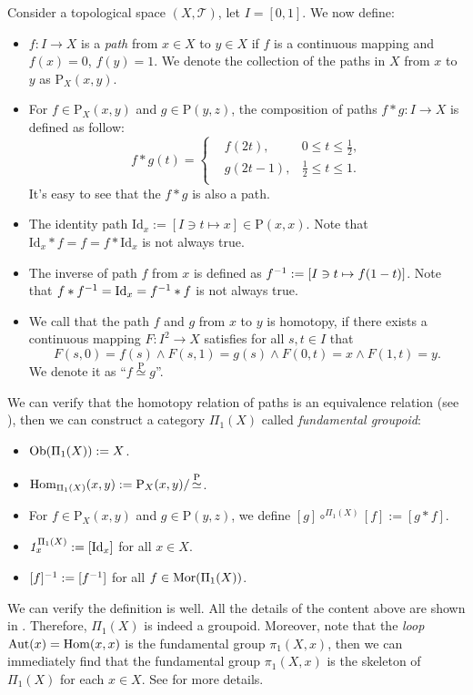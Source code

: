 \documentclass{article}
\begin{document}
\begin{exm}
	Consider a topological space $(X,\mathcal{T})$, let $I=[0,1]$. We now define: 
	\begin{itemize}
		\item $f:I\to X$ is a \emph{path} from $x\in X$ to $y\in X$ if $f$ is a continuous mapping and $f(x)=0$, $f(y)=1$. We denote the collection of the paths in $X$ from $x$ to $y$ as $\mathrm{P}_X(x,y)$.
		\item For $f\in\mathrm{P}_X(x,y)$ and $g\in\mathrm{P}(y,z)$, the composition of paths $f*g:I\to X$ is defined as follow:
			$$f*g(t)=\left\{\begin{aligned}
				& f(2t),   & 0\leq t\leq\frac{1}{2},\\
				& g(2t-1), & \frac{1}{2}\leq t\leq1.\\
			\end{aligned}\right.$$
			It's easy to see that the $f*g$ is also a path.
		\item The identity path $\mathrm{Id}_x:=[I\ni t\mapsto x]\in\mathrm{P}(x,x)$. Note that $\mathrm{Id}_x*f=f=f*\mathrm{Id}_x$ is not always true.
		\item The inverse of path $f$ from $x$ is defined as $f^{-1}:=[I\ni t\mapsto f(1-t)]$. Note that $f*f^{-1}=\mathrm{Id}_x=f^{-1}*f$ is not always true.
		\item We call that the path $f$ and $g$ from $x$ to $y$ is homotopy, if there exists a continuous mapping $F:I^2\to X$ satisfies for all $s,t\in I$ that
			$$F(s,0)=f(s)\wedge F(s,1)=g(s)\wedge F(0,t)=x\wedge F(1,t)=y.$$
		We denote it as ``$f\mathop{\simeq}\limits^\mathrm{P}g$''.
	\end{itemize}
	
	We can verify that the homotopy relation of paths is an equivalence relation (see \cite[定理 10.1.1]{top-1}), then we can construct a category $\Pi_1(X)$ called \emph{fundamental groupoid}:
	\begin{itemize}
		\item $\mathrm{Ob}(\Pi_1(X)):=X$.
		\item $\mathrm{Hom}_{\Pi_1(X)}(x,y):=\mathrm{P}_X(x,y)/\mathop{\simeq}\limits^\mathrm{P}$.
		\item For $f\in\mathrm{P}_X(x,y)$ and $g\in\mathrm{P}(y,z)$, we define $[g]\circ^{\Pi_1(X)}[f]:=[g*f]$.
		\item $\mathit{1}^{\Pi_1(X)}_x:=[\mathrm{Id}_x]$ for all $x\in X$.
		\item $[f]^{-1}:=[f^{-1}]$ for all $f\in\mathrm{Mor}(\Pi_1(X))$.
	\end{itemize}
	We can verify the definition is well. All the details of the content above are shown in \cite[\S10.1]{top-1}. Therefore, $\Pi_1(X)$ is indeed a groupoid. Moreover, note that the \emph {loop} $\mathrm{Aut}(x)=\mathrm{Hom}(x,x)$ is the fundamental group $\pi_1(X,x)$, then we can immediately find that the fundamental group $\pi_1(X,x)$ is the skeleton of $\Pi_1(X)$ for each $x\in X$. See \cite[Chapter 2]{top-2} for more details.
\end{exm}
\end{document}
